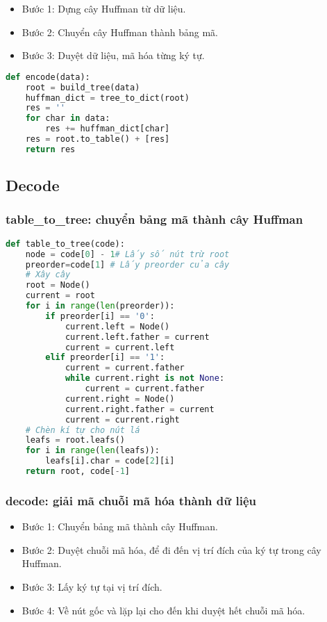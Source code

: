 \begin{itemize}
    \item Bước 1: Dựng cây Huffman từ dữ liệu.
    \item Bước 2: Chuyển cây Huffman thành bảng mã.
    \item Bước 3: Duyệt dữ liệu, mã hóa từng ký tự.
\end{itemize}

\begin{lstlisting}[language=Python]
def encode(data):
    root = build_tree(data)
    huffman_dict = tree_to_dict(root)
    res = ''
    for char in data:
        res += huffman_dict[char]
    res = root.to_table() + [res]
    return res
\end{lstlisting}

\subsection{Decode}

\subsubsection{table\_to\_tree: chuyển bảng mã thành cây Huffman}

\begin{lstlisting}[language=Python]
def table_to_tree(code):
    node = code[0] - 1# Lấy số nút trừ root
    preorder=code[1] # Lấy preorder của cây
    # Xây cây
    root = Node()
    current = root
    for i in range(len(preorder)):
        if preorder[i] == '0':
            current.left = Node()
            current.left.father = current
            current = current.left
        elif preorder[i] == '1':
            current = current.father
            while current.right is not None:
                current = current.father
            current.right = Node()
            current.right.father = current
            current = current.right
    # Chèn kí tự cho nút lá
    leafs = root.leafs()
    for i in range(len(leafs)):
        leafs[i].char = code[2][i]
    return root, code[-1]
\end{lstlisting}

\subsubsection{decode: giải mã chuỗi mã hóa thành dữ liệu}

\begin{itemize}
    \item Bước 1: Chuyển bảng mã thành cây Huffman.
    \item Bước 2: Duyệt chuỗi mã hóa, để đi đến vị trí đích của ký tự trong cây Huffman.
    \item Bước 3: Lấy ký tự tại vị trí đích.
    \item Bước 4: Về nút gốc và lặp lại cho đến khi duyệt hết chuỗi mã hóa.
\end{itemize}

